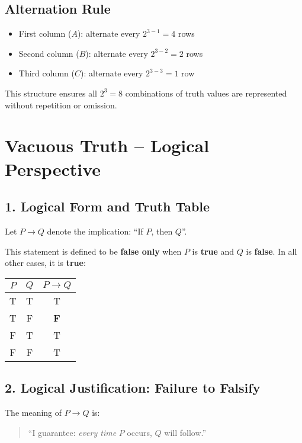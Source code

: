 \documentclass[10pt]{article}
\theoremstyle{plain}
\theoremstyle{definition}
\begin{document}
  \subsection*{Alternation Rule}
  
  \begin{itemize}
  	\item First column ($A$): alternate every $2^{3-1} = 4$ rows
  	\item Second column ($B$): alternate every $2^{3-2} = 2$ rows
  	\item Third column ($C$): alternate every $2^{3-3} = 1$ row
  \end{itemize}
  
  This structure ensures all $2^3 = 8$ combinations of truth values are represented without repetition or omission.
  
  \section*{Vacuous Truth – Logical Perspective}
  
  \subsection*{1. Logical Form and Truth Table}
  
  Let $P \rightarrow Q$ denote the implication: “If $P$, then $Q$”.
  
  This statement is defined to be \textbf{false only} when $P$ is \textbf{true} and $Q$ is \textbf{false}. In all other cases, it is \textbf{true}:
  
  \begin{center}
  	\begin{tabular}{|c|c|c|}
  		\hline
  		$P$ & $Q$ & $P \rightarrow Q$ \\
  		\hline
  		T & T & T \\
  		T & F & \textbf{F} \\ %
  		F & T & T \\
  		F & F & T \\
  		\hline
  	\end{tabular}
  \end{center}
  
  \subsection*{2. Logical Justification: Failure to Falsify}
  
  The meaning of $P \rightarrow Q$ is:
  \begin{quote}
  	“I guarantee: \textit{every time} $P$ occurs, $Q$ will follow.”
  \end{quote}
  
\end{document}
